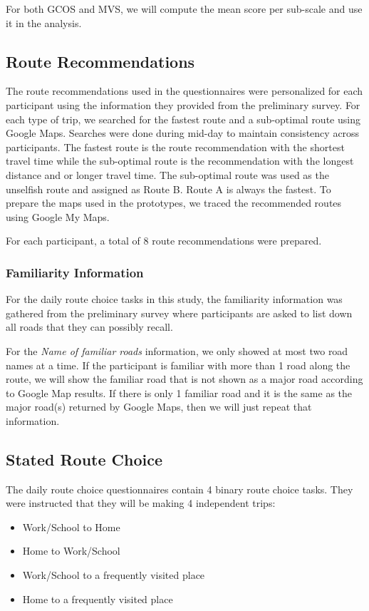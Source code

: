 For both GCOS and MVS, we will compute the mean score per sub-scale and use it in the analysis.

\subsection{Route Recommendations}
The route recommendations used in the questionnaires were personalized for each participant using the information they provided from the preliminary survey. For each type of trip, we searched for the fastest route and a sub-optimal route using Google Maps. Searches were done during mid-day to maintain consistency across participants. The fastest route is the route recommendation with the shortest travel time while the sub-optimal route is the recommendation with the longest distance and or longer travel time. The sub-optimal route was used as the unselfish route and assigned as Route B. Route A is always the fastest. To prepare the maps used in the prototypes, we traced the recommended routes using Google My Maps. 

For each participant, a total of 8 route recommendations were prepared. 

\subsubsection{Familiarity Information}
For the daily route choice tasks in this study, the familiarity information was gathered from the preliminary survey where participants are asked to list down all roads that they can possibly recall. 

For the \textit{Name of familiar roads} information, we only showed at most two road names at a time. If the participant is familiar with more than 1 road along the route, we will show the familiar road that is not shown as a major road according to Google Map results. If there is only 1 familiar road and it is the same as the major road(s) returned by Google Maps, then we will just repeat that information.

\subsection{Stated Route Choice}
The daily route choice questionnaires contain 4 binary route choice tasks. They were instructed that they will be making 4 independent trips: 
\begin{itemize}
    \item Work/School to Home
    \item Home to Work/School
    \item Work/School to a frequently visited place
    \item Home to a frequently visited place 
\end{itemize}

